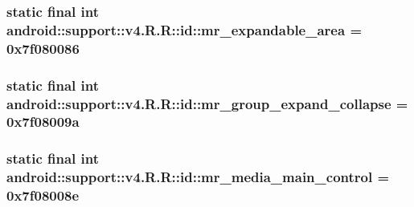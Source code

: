 \hypertarget{classandroid_1_1support_1_1v4_1_1_r_1_1id_1246c4d8cf98d51365aee4fad816203f}{
\subsubsection[{mr\_\-expandable\_\-area}]{\setlength{\rightskip}{0pt plus 5cm}static final int android::support::v4.R.R::id::mr\_\-expandable\_\-area = 0x7f080086}}
\label{classandroid_1_1support_1_1v4_1_1_r_1_1id_1246c4d8cf98d51365aee4fad816203f}


\hypertarget{classandroid_1_1support_1_1v4_1_1_r_1_1id_03e3c6a6777a1688abca857ee0841a07}{
\subsubsection[{mr\_\-group\_\-expand\_\-collapse}]{\setlength{\rightskip}{0pt plus 5cm}static final int android::support::v4.R.R::id::mr\_\-group\_\-expand\_\-collapse = 0x7f08009a}}
\label{classandroid_1_1support_1_1v4_1_1_r_1_1id_03e3c6a6777a1688abca857ee0841a07}


\hypertarget{classandroid_1_1support_1_1v4_1_1_r_1_1id_5c829f3f143ecd2ab6aa2080e6b2be82}{
\subsubsection[{mr\_\-media\_\-main\_\-control}]{\setlength{\rightskip}{0pt plus 5cm}static final int android::support::v4.R.R::id::mr\_\-media\_\-main\_\-control = 0x7f08008e}}
\label{classandroid_1_1support_1_1v4_1_1_r_1_1id_5c829f3f143ecd2ab6aa2080e6b2be82}


